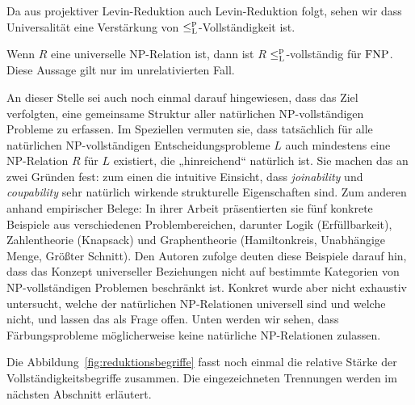 Da aus projektiver Levin-Reduktion auch Levin-Reduktion folgt, sehen wir dass Universalität eine Verstärkung von $\leq_\mathrm{L}^\mathrm{p}$-Vollständigkeit ist.
\begin{corollary}
    Wenn $R$ eine universelle NP-Relation ist, dann ist $R$ $\leq_\mathrm{L}^\mathrm{p}$-vollständig für $\mathrm{FNP}$.
    Diese Aussage gilt nur im unrelativierten Fall.
\end{corollary}

An dieser Stelle sei auch noch einmal darauf hingewiesen, dass \textcite{agrawal_universal_1992} das Ziel verfolgten, eine gemeinsame Struktur aller natürlichen NP-vollständigen Probleme zu erfassen. Im Speziellen vermuten sie, dass tatsächlich für alle natürlichen NP-vollständigen Entscheidungsprobleme $L$ auch mindestens eine NP-Relation $R$ für $L$ existiert, die „hinreichend“ natürlich ist. Sie machen das an zwei Gründen fest: zum einen die intuitive Einsicht, dass \emph{joinability} und \emph{coupability} sehr natürlich wirkende strukturelle Eigenschaften sind. Zum anderen anhand empirischer Belege: 
 In ihrer Arbeit präsentierten sie fünf konkrete Beispiele aus verschiedenen Problembereichen, darunter Logik (Erfüllbarkeit), Zahlentheorie (Knapsack) und Graphentheorie (Hamiltonkreis, Unabhängige Menge, Größter Schnitt). Den Autoren zufolge deuten diese Beispiele darauf hin, dass das Konzept universeller Beziehungen nicht auf bestimmte Kategorien von NP-vollständigen Problemen beschränkt ist. 
 Konkret wurde aber nicht exhaustiv untersucht, welche der natürlichen NP-Relationen universell sind und welche nicht, und \textcite{agrawal_universal_1992} lassen das als Frage offen. Unten werden wir sehen, dass Färbungsprobleme möglicherweise keine natürliche NP-Relationen zulassen. %

Die Abbildung~\ref{fig:reduktionsbegriffe} fasst noch einmal die relative Stärke der Vollständigkeitsbegriffe zusammen. Die eingezeichneten Trennungen werden im nächsten Abschnitt erläutert.

